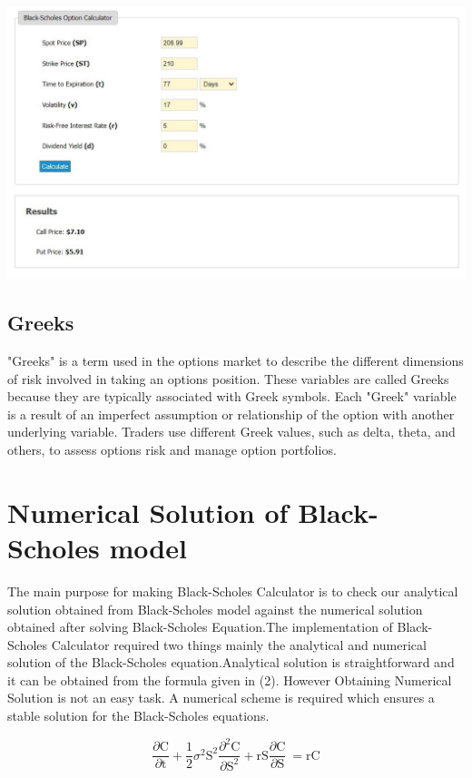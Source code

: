 \documentclass[12pt]{article}
\begin{document}
\includegraphics[width=16cm]{P2}

\subsection{Greeks}
"Greeks" is a term used in the options market to describe the different dimensions of risk involved in taking an options position. These variables are called Greeks because they are typically associated with Greek symbols. Each "Greek" variable is a result of an imperfect assumption or relationship of the option with another underlying variable. Traders use different Greek values, such as delta, theta, and others, to assess options risk and manage option portfolios. 


	
	

\section{Numerical Solution of Black-Scholes model} \label{The Black-Scholes Model}

The main purpose for making Black-Scholes Calculator is to check our analytical solution obtained from Black-Scholes model against the numerical solution obtained after solving Black-Scholes Equation.The implementation of  Black-Scholes Calculator required two things mainly the analytical and numerical solution of the Black-Scholes equation.Analytical solution is straightforward and it can be obtained from the formula given in (2). However Obtaining Numerical Solution is not an easy task. A numerical scheme is required which ensures a stable solution for the Black-Scholes equations.

\begin{equation}
	\frac{\partial \mathrm C}{ \partial \mathrm t } + \frac{1}{2}\sigma^{2} \mathrm S^{2} \frac{\partial^{2} \mathrm C}{\partial \mathrm S^2}
	+ \mathrm r \mathrm S \frac{\partial \mathrm C}{\partial \mathrm S}\ =
	\mathrm r \mathrm C 
	\label{eq:5}
\end{equation}
\end{document}
